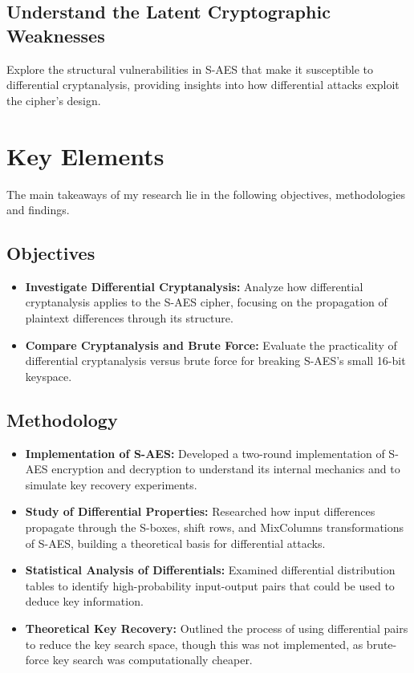 \documentclass{article}
\begin{document}
\subsection{Understand the Latent Cryptographic Weaknesses}
Explore the structural vulnerabilities in S-AES that make it susceptible to differential cryptanalysis, providing insights into how differential attacks exploit the cipher’s design.

\newpage

\section{Key Elements}
The main takeaways of my research lie in the following objectives, methodologies and findings.

\subsection{Objectives}
\begin{itemize}
    \item \textbf{Investigate Differential Cryptanalysis:} Analyze how differential cryptanalysis applies to the S-AES cipher, focusing on the propagation of plaintext differences through its structure.

    \item \textbf{Compare Cryptanalysis and Brute Force:} Evaluate the practicality of differential cryptanalysis versus brute force for breaking S-AES's small 16-bit keyspace.
\end{itemize}

\subsection{Methodology}
\begin{itemize}
    \item \textbf{Implementation of S-AES:} Developed a two-round implementation of S-AES encryption and decryption to understand its internal mechanics and to simulate key recovery experiments.

    \item \textbf{Study of Differential Properties:} Researched how input differences propagate through the S-boxes, shift rows, and MixColumns transformations of S-AES, building a theoretical basis for differential attacks.

    \item \textbf{Statistical Analysis of Differentials:} Examined differential distribution tables to identify high-probability input-output pairs that could be used to deduce key information.

    \item \textbf{Theoretical Key Recovery:} Outlined the process of using differential pairs to reduce the key search space, though this was not implemented, as brute-force key search was computationally cheaper.
\end{itemize}
\end{document}

